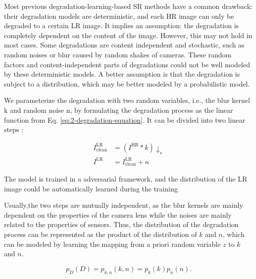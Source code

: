             Most previous degradation-learning-based SR methods have a common drawback: their degradation models are deterministic, and each HR image can only be degraded to a certain LR image.
            It implies an assumption: the degradation is completely dependent on the content of the image.
            However, this may not hold in most cases.
            Some degradations are content independent and stochastic, such as random noises or blur caused by random shakes of cameras. 
            These random factors and content-independent parts of degradations could not be well modeled by these deterministic models. 
            A better assumption is that the degradation is subject to a distribution, which may be better modeled by a probabilistic model.
            
            We parameterize the degradation with two random variables, i.e., the blur kernel k and random noise n, by formulating the degradation process as the linear function from Eq. \ref{eq:2-degradation-equation}.
            It can be divided into two linear steps \cite{zhu2020unpaired}: 

            \begin{equation}
                \begin{aligned}
                        I^{\text{LR}}_{\text{clean}} &= (I^{\text{HR}} * k) \downarrow_s \\
                        I^{\text{LR}} &= I^{\text{LR}}_{\text{clean}} + n
                \end{aligned}
            \end{equation}
            
            
            The model is trained in a adversarial framework, and the distribution of the LR image could be automatically learned during the training        
            
            Usually,the two steps are mutually independent, as the blur kernels are mainly dependent on the properties of the camera lens while the noises are mainly related to the properties of sensors. 
            Thus, the distribution of the degradation process can be represented as the product of the distribution of $k$ and $n$, which can be modeled by learning the mapping from a priori random variable $z$ to $k$ and $n$.


            \begin{equation}
                p_{D}(D) = p_{k,n}(k, n) = p_{k}(k)p_{n}(n).
            \end{equation}

